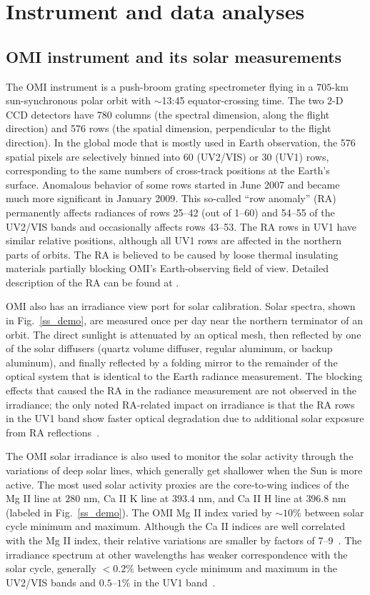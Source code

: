 \documentclass[amt,manuscript]{copernicus}
\begin{document}
\section{Instrument and data analyses}

\subsection{OMI instrument and its solar measurements}
The OMI instrument is a push-broom grating spectrometer flying in a $705$-km sun-synchronous polar orbit with $\sim$13:45 equator-crossing time. The two 2-D CCD detectors have 780 columns (the spectral dimension, along the flight direction) and 576 rows (the spatial dimension, perpendicular to the flight direction). In the global mode that is mostly used in Earth observation, the 576 spatial pixels are selectively binned into 60 (UV2/VIS) or 30 (UV1) rows, corresponding to the same numbers of cross-track positions at the Earth's surface. Anomalous behavior of some rows started in June 2007 and became much more significant in January 2009. This so-called ``row anomaly'' (RA) permanently affects radiances of rows 25--42 (out of 1--60) and 54--55 of the UV2/VIS bands and occasionally affects rows 43--53. The RA rows in UV1 have similar relative positions, although all UV1 rows are affected in the northern parts of orbits. The RA is believed to be caused by loose thermal insulating materials partially blocking OMI's Earth-observing field of view. Detailed description of the RA can be found at \citet{schenkeveld2016}.

OMI also has an irradiance view port for solar calibration. Solar spectra, shown in Fig.~\ref{ss_demo}, are measured once per day near the northern terminator of an orbit. The direct sunlight is attenuated by an optical mesh, then reflected by one of the solar diffusers (quartz volume diffuser, regular aluminum, or backup aluminum), and finally reflected by a folding mirror to the remainder of the optical system that is identical to the Earth radiance measurement. The blocking effects that caused the RA in the radiance measurement are not observed in the irradiance; the only noted RA-related impact on irradiance is that the RA rows in the UV1 band show faster optical degradation due to additional solar exposure from RA reflections~\citep{schenkeveld2016}.

The OMI solar irradiance is also used to monitor the solar activity through the variations of deep solar lines, which generally get shallower when the Sun is more active. The most used solar activity proxies are the core-to-wing indices of the Mg II line at $280$ nm, Ca II K line at $393.4$ nm, and Ca II H line at $396.8$ nm (labeled in Fig.~\ref{ss_demo}). The OMI Mg II index varied by $\sim10\%$ between solar cycle minimum and maximum. Although the Ca II indices are well correlated with the Mg II index, their relative variations are smaller by factors of 7--9~\citep{deland2013the}. The irradiance spectrum at other wavelengths has weaker correspondence with the solar cycle, generally $<0.2\%$ between cycle minimum and maximum in the UV2/VIS bands and $0.5$--$1\%$ in the UV1 band~\citep{marchenko2016solar}.
\end{document}
